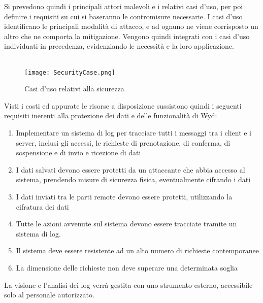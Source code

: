 \clearpage
Si prevedono quindi i principali attori malevoli e i relativi casi d'uso, 
per poi definire i requisiti su cui si baseranno le contromisure necessarie. 
I casi d'uso identificano le principali modalità di attacco, 
e ad ognuno ne viene corrisposto un altro che ne comporta la mitigazione. 
Vengono quindi integrati con i casi d'uso individuati in precedenza, 
evidenziando le necessità e la loro applicazione.\\
\\
\begin{figure}[h!]
    \begin{center}
        \texttt{[image: SecurityCase.png]}
        \caption{Casi d'uso relativi alla sicurezza}
    \end{center}

\end{figure}
\clearpage

Visti i costi ed appurate le risorse a disposizione sussistono quindi i seguenti requisiti 
inerenti alla protezione dei dati e delle funzionalità di Wyd:
\begin{enumerate}
    \item Implementare un sistema di log per tracciare tutti i messaggi tra i client e i server, inclusi gli accessi, le richieste di prenotazione, di conferma, di sospensione e di invio e ricezione di dati
    \item I dati salvati devono essere protetti da un attaccante che abbia accesso al sistema, prendendo misure di sicurezza fisica, eventualmente cifrando i dati
    \item I dati inviati tra le parti remote devono essere protetti, utilizzando la cifratura dei dati
    \item Tutte le azioni avvenute sul sistema devono essere tracciate tramite un sistema di log.
    \item Il sistema deve essere resistente ad un alto numero di richieste contemporanee
    \item La dimensione delle richieste non deve superare una determinata soglia
\end{enumerate}

La visione e l'analisi dei log verrà gestita con uno strumento esterno, accessibile solo al personale autorizzato.


